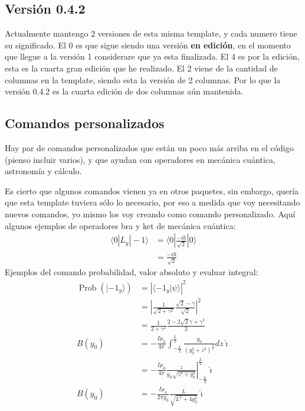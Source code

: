 \documentclass[11pt,letterpaper]{article}
\DeclareMathOperator{\probabi}{Prob}               %
\newcommand{\prob}[1]{\probabi\left( #1 \right)}   %
\newcommand{\abs}[1]{\left|#1\right|}              %
\newcommand{\bra}[1]{\langle #1 |}                 %
\newcommand{\ket}[1]{| #1 \rangle}                 %
\newcommand{\braket}[2]{\langle #1 | #2 \rangle}   %
\newcommand{\eval}[3]{\left.#1\right|_{#2}^{#3}}   %
\begin{document}
\begin{multicols}{2}

\subsection*{Versión 0.4.2}
Actualmente mantengo 2 versiones de esta misma template, y cada numero tiene su significado. El 0 es que sigue siendo una versión \textbf{en edición}, en el momento que llegue a la versión 1 considerare que ya esta finalizada. El 4 es por la edición, esta es la cuarta gran edición que he realizado. El 2 viene de la cantidad de columnas en la template, siendo esta la versión de 2 columnas. Por lo que la versión 0.4.2 es la cuarta edición de dos columnas aún mantenida.
\subsection*{Comandos personalizados}

Hay par de comandos personalizados que están un poco más arriba en el código (pienso incluir varios), y que ayudan con operadores en mecánica cuántica, astronomía y cálculo.\par

Es cierto que algunos comandos vienen ya en otros paquetes, sin embargo, quería que esta template tuviera sólo lo necesario, por eso a medida que voy necesitando nuevos comandos, yo mismo los voy creando como comando personalizado. Aquí algunos ejemplos de operadores bra y ket de mecánica cuántica:
\begin{equation*}
    \begin{split}
        \bra{0}L_y\ket{-1} &= \bra{0}\frac{-i\hbar}{\sqrt{2}}\ket{0}\\
        &= \frac{-i\hbar}{\sqrt{2}}
    \end{split}
\end{equation*}
Ejemplos del comando probabilidad, valor absoluto y evaluar integral:
\begin{equation*}
    \begin{split}
        \prob{\ket{-1_y}} &= \abs{\braket{-1_y}{\psi}}^2\\
        &= \abs{\frac{1}{\sqrt{2+\gamma^2}}\frac{\sqrt{2} - \gamma}{\sqrt{2}}}^2\\
        &= \frac{1}{2+\gamma^2}\frac{2-2\sqrt{2}\gamma + \gamma^2}{2}\\
        B(y_0) &= -\frac{I\mu_0}{4\pi}\int_{-\frac{L}{2}}^{\frac{L}{2}} \frac{y_0}{(y_0^2 + z^2)^{\frac{3}{2}}}dz\hat{\imath}\\
        &= -\frac{I\mu_0}{4\pi}\eval{\frac{z}{y_0\sqrt{z^2+y_0^2}}}{-\frac{L}{2}}{\frac{L}{2}}\hat{\imath}\\
        B(y_0) &= -\frac{I\mu_0}{2\pi y_0}\frac{L}{\sqrt{L^2 + 4y_0^2}}\hat{\imath}
    \end{split}
\end{equation*}


\end{multicols}
\end{document}
